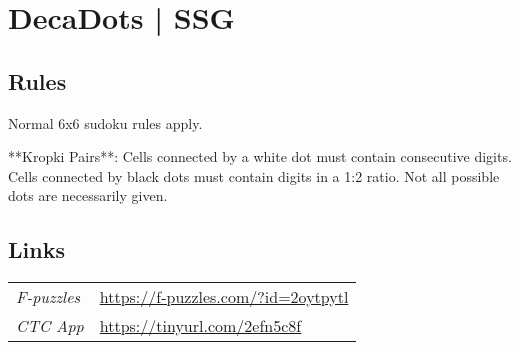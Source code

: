 \section[DecaDots | SSG {[\emph{Kropki Pairs Sudoku}]}]{DecaDots | {\normalfont SSG}}
\label{sec:31-decadots-ssg}

\subsection*{Rules}
\begin{markdown}
Normal 6x6 sudoku rules apply.



**Kropki Pairs**: Cells connected by a white dot must contain consecutive digits. Cells connected by black dots must contain digits in a 1:2 ratio. Not all possible dots are necessarily given.
\end{markdown}
\subsection*{Links}
\begin{tabularx}{\textwidth}{l X}
\emph{F-puzzles} & \url{https://f-puzzles.com/?id=2oytpytl} \\
\emph{CTC App} & \url{https://tinyurl.com/2efn5c8f} \\
\end{tabularx}
\pagebreak
